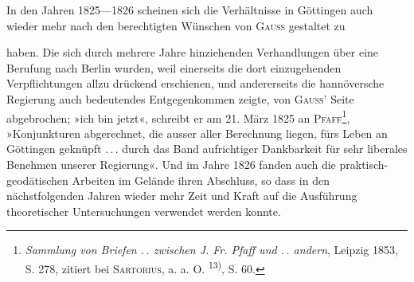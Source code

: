 In den Jahren 1825—1826 scheinen sich die Verhältnisse in Göttingen
auch wieder mehr nach den berechtigten Wünschen von \textsc{Gauss} gestaltet zu
\par\clearpage{}
\noindent haben. Die sich durch mehrere Jahre hinziehenden Verhandlungen über eine
Berufung nach Berlin wurden, weil einerseits die dort einzugehenden Verpflichtungen
allzu drückend erschienen, und andererseits die hannöversche Regierung
auch bedeutendes Entgegenkommen zeigte, von \textsc{Gauss}' Seite abgebrochen;
»ich bin jetzt«, schreibt er am 21. März 1825 an \textsc{Pfaff}\footnote{\textit{Sammlung von Briefen \mbox{.\,.} zwischen J. Fr. Pfaff und \mbox{.\,.} andern}, Leipzig 1853, S. 278, zitiert bei \textsc{Sartorius}, a. a. O. \textsuperscript{13)}, S. 60.}, »Konjunkturen
abgerechnet, die ausser aller Berechnung liegen, fürs Leben an
Göttingen geknüpft \mbox{.\,.\,.} durch das Band aufrichtiger Dankbarkeit für sehr
liberales Benehmen unserer Regierung«. Und im Jahre 1826 fanden auch die
praktisch-geodätischen Arbeiten im Gelände ihren Abschluss, so dass in den
nächstfolgenden Jahren wieder mehr Zeit und Kraft auf die Ausführung theoretischer
Untersuchungen verwendet werden konnte.
